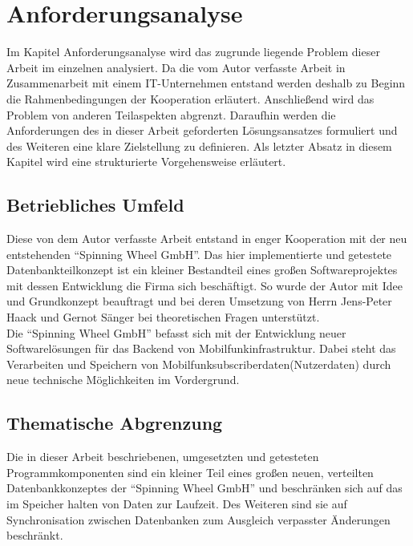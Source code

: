 \documentclass[a4paper,11pt,oneside,%
headsepline,												%
footsepline,												%
bibtotocnumbered									%
]{scrreprt}
\begin{document}
\chapter{Anforderungsanalyse}
Im Kapitel Anforderungsanalyse wird das zugrunde liegende Problem dieser Arbeit im einzelnen analysiert. Da die vom Autor verfasste Arbeit in Zusammenarbeit mit einem IT-Unternehmen entstand werden deshalb zu Beginn die Rahmenbedingungen der Kooperation erläutert. Anschließend wird das Problem von anderen Teilaspekten abgrenzt. Daraufhin werden die Anforderungen des in dieser Arbeit geforderten Lösungsansatzes formuliert und des Weiteren eine klare Zielstellung zu definieren.  
Als letzter Absatz in diesem Kapitel wird eine strukturierte Vorgehensweise erläutert.

\section{Betriebliches Umfeld}
Diese von dem Autor verfasste Arbeit entstand in enger Kooperation mit der neu entstehenden \enquote{Spinning Wheel GmbH}. Das hier implementierte und getestete Datenbankteilkonzept ist ein kleiner Bestandteil eines großen Softwareprojektes mit dessen Entwicklung die Firma sich beschäftigt. So wurde der Autor mit Idee und Grundkonzept beauftragt und bei deren Umsetzung von Herrn Jens-Peter Haack und Gernot Sänger bei theoretischen Fragen unterstützt.\\

Die \enquote{Spinning Wheel GmbH} befasst sich mit der Entwicklung neuer Softwarelösungen für das Backend von Mobilfunkinfrastruktur. Dabei steht das Verarbeiten und Speichern von Mobilfunksubscriberdaten(Nutzerdaten) durch neue technische Möglichkeiten im Vordergrund.

\section{Thematische Abgrenzung}
Die in dieser Arbeit beschriebenen, umgesetzten und getesteten Programmkomponenten sind ein kleiner Teil eines großen neuen, verteilten Datenbankkonzeptes der \enquote{Spinning Wheel GmbH} und beschränken sich auf das im Speicher halten von Daten zur Laufzeit. Des Weiteren sind sie auf Synchronisation zwischen Datenbanken zum Ausgleich verpasster Änderungen beschränkt.\\
\end{document}
